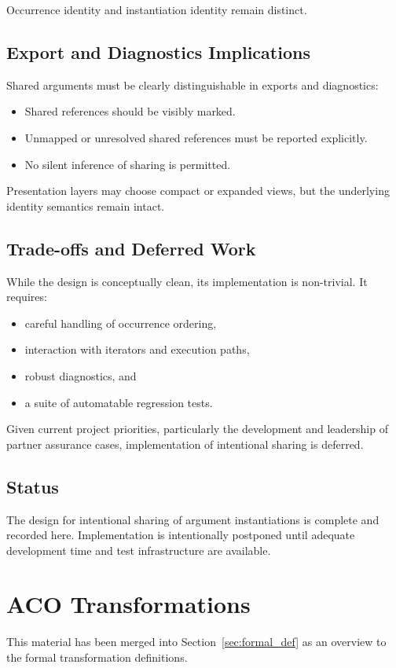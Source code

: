 \documentclass[12pt,twoside,a4paper]{article}
\begin{document}
Occurrence identity and instantiation identity remain distinct.

\subsection{Export and Diagnostics Implications}

Shared arguments must be clearly distinguishable in exports and diagnostics:
\begin{itemize}
  \item Shared references should be visibly marked.
  \item Unmapped or unresolved shared references must be reported explicitly.
  \item No silent inference of sharing is permitted.
\end{itemize}

Presentation layers may choose compact or expanded views, but the underlying identity semantics remain intact.

\subsection{Trade-offs and Deferred Work}

While the design is conceptually clean, its implementation is non-trivial. It requires:
\begin{itemize}
  \item careful handling of occurrence ordering,
  \item interaction with iterators and execution paths,
  \item robust diagnostics, and
  \item a suite of automatable regression tests.
\end{itemize}

Given current project priorities, particularly the development and leadership of partner assurance cases, implementation of intentional sharing is deferred.

\subsection{Status}

The design for intentional sharing of argument instantiations is complete and recorded here. Implementation is intentionally postponed until adequate development time and test infrastructure are available.


\section{ACO Transformations}
This material has been merged into Section~\ref{sec:formal_def} as an overview to the formal transformation definitions.
\end{document}
